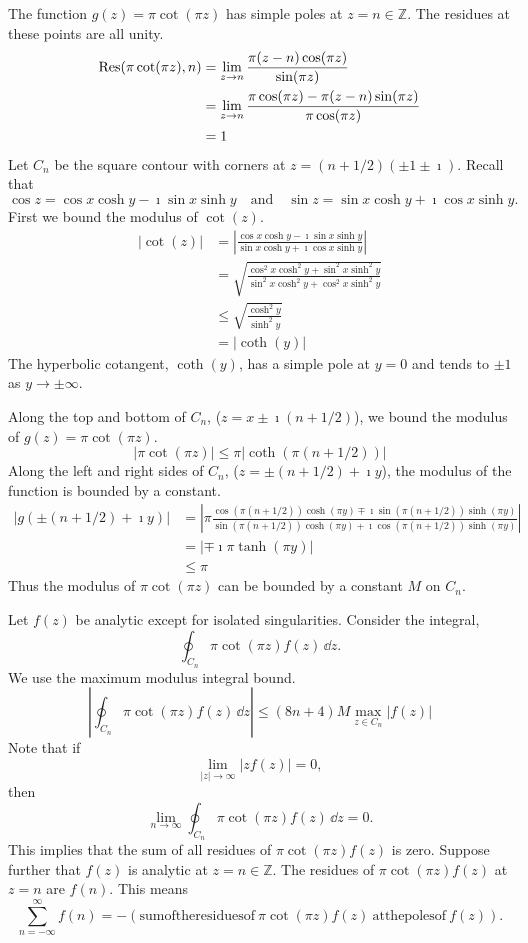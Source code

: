 The function $g(z) = \pi \cot (\pi z)$ has simple poles at 
$z = n \in \mathbb{Z}$.  The residues at these points are all unity.
\begin{align*}
  \mathop{\mathrm{Res}}\nolimits ( \pi \cot (\pi z), n )
  &= \lim_{z \to n} \frac{ \pi (z-n) \cos (\pi z) }{ \sin (\pi z) } \\
  &= \lim_{z \to n} \frac{ \pi \cos (\pi z) - \pi (z-n) \sin (\pi z) }
  { \pi \cos (\pi z) } \\
  &= 1
\end{align*}
Let $C_n$ be the square contour with corners at $z = (n + 1/2)(\pm 1 \pm \imath)$.
Recall that
\[
\cos z = \cos x \cosh y - \imath \sin x \sinh y
\quad \mathrm{and} \quad
\sin z = \sin x \cosh y + \imath \cos x \sinh y.
\]
First we bound the modulus of $\cot(z)$.
\begin{align*}
  |\cot(z)|
  &= \left| \frac{ \cos x \cosh y - \imath \sin x \sinh y }
    { \sin x \cosh y + \imath \cos x \sinh y } \right| \\
  &= \sqrt{ \frac{ \cos^2 x \cosh^2 y + \sin^2 x \sinh^2 y }
    { \sin^2 x \cosh^2 y + \cos^2 x \sinh^2 y } } \\
  &\leq \sqrt{ \frac{ \cosh^2 y }{ \sinh^2 y } } \\
  &= | \coth(y) |
\end{align*}
The hyperbolic cotangent, $\coth(y)$, has a simple pole at $y = 0$ and tends
to $\pm 1$ as $y \to \pm \infty$.

Along the top and bottom of $C_n$, ($z = x \pm \imath (n + 1/2)$), we bound 
the modulus of $g(z) = \pi \cot( \pi z )$.
\[
| \pi \cot (\pi z) | \leq \pi \big| \coth( \pi (n + 1/2) ) \big|
\]
Along the left and right sides of $C_n$, ($z = \pm (n + 1/2) + \imath y$), 
the modulus of the function is bounded by a constant.
\begin{align*}
  | g( \pm (n+1/2) + \imath y ) |
  &= \left| \pi \frac{ \cos (\pi(n+1/2)) \cosh (\pi y) 
      \mp \imath \sin (\pi(n+1/2)) \sinh (\pi y) }
    { \sin (\pi(n+1/2)) \cosh (\pi y)
      + \imath \cos (\pi(n+1/2)) \sinh (\pi y) } \right| \\
  &= \left| \mp \imath \pi \tanh (\pi y) \right| \\
  &\leq \pi
\end{align*}
Thus the modulus of $\pi \cot(\pi z)$ can be bounded by a constant $M$ on $C_n$.


Let $f(z)$ be analytic except for isolated singularities.  
Consider the integral,
\[
\oint_{C_n} \pi \cot(\pi z) f(z)\,\dd z.
\]
We use the maximum modulus integral bound.
\[
\left| \oint_{C_n} \pi \cot(\pi z) f(z)\,\dd z \right|
\leq (8 n + 4) M \max_{z \in C_n} |f(z)|
\]
Note that if 
\[
\lim_{|z| \to \infty} \left| z f(z) \right| = 0,
\]
then
\[
\lim_{n \to \infty} \oint_{C_n} \pi \cot(\pi z) f(z)\,\dd z = 0.
\]
This implies that the sum of all residues of $\pi \cot(\pi z) f(z)$ is zero.
Suppose further that $f(z)$ is analytic at $z = n \in \mathbb{Z}$.  The
residues of $\pi \cot(\pi z) f(z)$ at $z = n$ are $f(n)$.  This means
\[
\sum_{n = -\infty}^\infty f(n) = -( \mathrm{sum of the residues of}\ 
  \pi \cot(\pi z) f(z)\ \mathrm{at the poles of}\ f(z)).
\]

